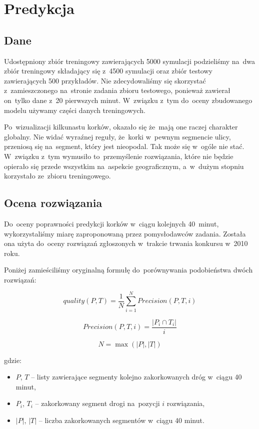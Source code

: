 \documentclass[a4paper,12pt]{mwart}
\begin{document}
\section{Predykcja}

\subsection{Dane}

Udostępniony zbiór treningowy zawierających 5000 symulacji podzieliśmy na~dwa zbiór treningowy składający się z~4500 symulacji oraz zbiór testowy zawierających 500 przykładów. Nie zdecydowaliśmy się skorzystać z~zamieszczonego na~stronie zadania zbioru testowego, ponieważ zawierał on~tylko dane z~20 pierwszych minut. W~związku z~tym do~oceny zbudowanego modelu używamy części danych treningowych.

Po~wizualizacji kilkunastu korków, okazało się że~mają one raczej charakter globalny. Nie widać wyraźnej reguły, że~korki w~pewnym segmencie ulicy, przeniosą się na~segment, który jest nieopodal. Tak może się w~ogóle nie stać. W~związku z~tym wymusiło to~przemyślenie rozwiązania, które nie będzie opierało się przede wszystkim na~aspekcie geograficznym, a~w~dużym stopniu korzystało ze~zbioru treningowego.

\subsection{Ocena rozwiązania}

Do~oceny poprawności predykcji korków w~ciągu kolejnych 40~minut, wykorzystaliśmy miarę zaproponowaną przez pomysłodawców zadania. Została ona użyta do~oceny rozwiązań zgłoszonych w~trakcie trwania konkursu w~2010 roku.

Poniżej zamieściliśmy oryginalną formułę do~porównywania podobieństwa dwóch rozwiązań:

\[quality(P, T) = \frac{1}{N}\sum_{i = 1}^N Precision(P, T, i)\]

\[Precision(P, T, i) = \frac{\left | P_i \cap T_i \right |}{i}\]

\[N = \max (\left | P \right |, \left | T \right |)\]

gdzie:

\begin{itemize}
\item $P$, $T$ -- listy zawierające segmenty kolejno zakorkowanych dróg w~ciągu 40 minut,
\item $P_i$, $T_i$ -- zakorkowany segment drogi na~pozycji $i$ rozwiązania,
\item $\left | P \right |$, $\left | T \right |$ -- liczba zakorkowanych segmentów w~ciągu 40 minut.
\end{itemize}
\end{document}
